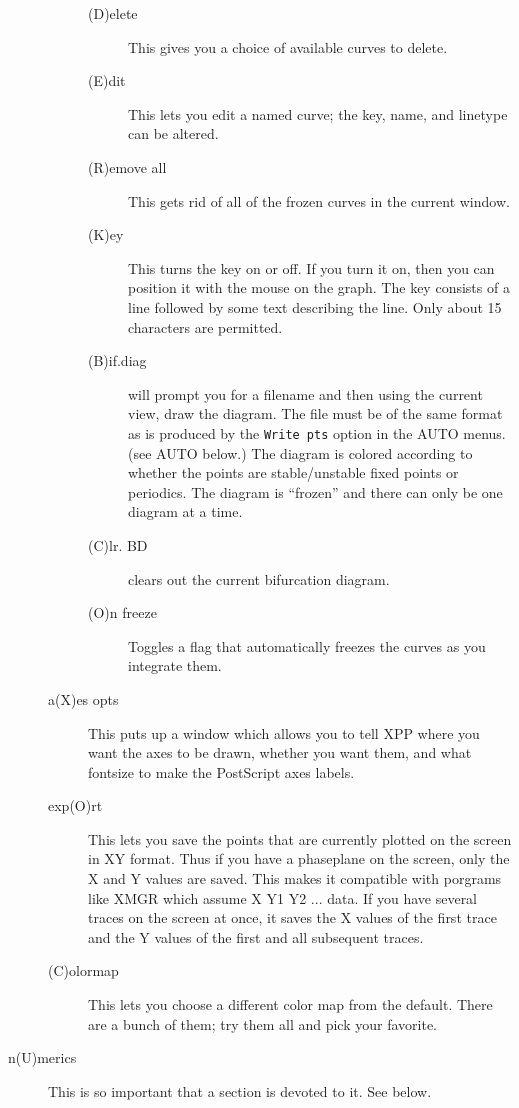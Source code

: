 \documentclass{article}
\begin{document}
\begin{description}
\begin{description}
\begin{description}
\item[(D)elete]  This gives you a choice of available curves to
delete.
\item[(E)dit] This lets you edit a named curve; the key, name, and
linetype can be altered.
\item[(R)emove all]  This gets rid of all of the frozen curves in the
current window.
\item[(K)ey] This turns the key on or off.  If you turn it on, then
you can position it with the mouse on the graph.  The key consists of
a line followed by some text describing the line.  Only about 15
characters are permitted.
\item[(B)if.diag] will prompt you for a filename and then using the
current view, draw the diagram. The file must be of the same format as
is produced by the {\tt Write pts} option in the AUTO menus. (see AUTO
below.)  The diagram is colored according to whether the points are
stable/unstable fixed points or periodics. The diagram is ``frozen''
and there can only be one diagram at a time.
\item[(C)lr. BD] clears out the current bifurcation diagram.
\item[(O)n freeze] Toggles a flag that automatically freezes the
curves as you integrate them.
\end{description}
\item[a(X)es opts]  This puts up a window which allows you to tell XPP
where you want the axes to be drawn, whether you want them, and what
fontsize to make the PostScript axes labels.
\item[exp(O)rt]  This lets you save the points that are currently
plotted on the screen in XY format. Thus if you have a phaseplane on
the screen, only the X and Y values are saved. This makes it
compatible with porgrams like XMGR which assume X Y1 Y2 ... data. If
you have several traces on the screen at once, it saves the X values
of the first trace and the Y values of the first and all subsequent
traces.
\item[(C)olormap] This lets you choose a different color map from the
default. There are a bunch of them; try them all and pick your
favorite.

\end{description}

\item[n(U)merics] This is so important that a section is devoted to
it. See below.


\end{description}
\end{document}
